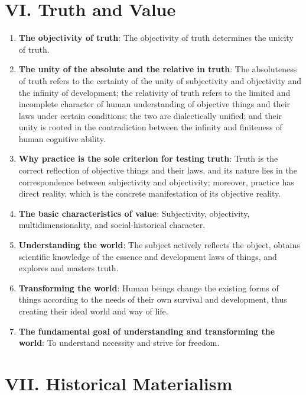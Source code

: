 \documentclass[12pt,a4paper]{ctexart}
\begin{document}
\section{VI. Truth and Value}

\begin{enumerate}[leftmargin=2em]
    \item \textbf{The objectivity of truth}: The objectivity of truth determines the unicity of truth.
    
    \item \textbf{The unity of the absolute and the relative in truth}: The absoluteness of truth refers to the certainty of the unity of subjectivity and objectivity and the infinity of development; the relativity of truth refers to the limited and incomplete character of human understanding of objective things and their laws under certain conditions; the two are dialectically unified; and their unity is rooted in the contradiction between the infinity and finiteness of human cognitive ability.
    
    \item \textbf{Why practice is the sole criterion for testing truth}: Truth is the correct reflection of objective things and their laws, and its nature lies in the correspondence between subjectivity and objectivity; moreover, practice has direct reality, which is the concrete manifestation of its objective reality.
    
    \item \textbf{The basic characteristics of value}: Subjectivity, objectivity, multidimensionality, and social-historical character.
    
    \item \textbf{Understanding the world}: The subject actively reflects the object, obtains scientific knowledge of the essence and development laws of things, and explores and masters truth.
    
    \item \textbf{Transforming the world}: Human beings change the existing forms of things according to the needs of their own survival and development, thus creating their ideal world and way of life.
    
    \item \textbf{The fundamental goal of understanding and transforming the world}: To understand necessity and strive for freedom.
\end{enumerate}

\section{VII. Historical Materialism}
\end{document}
